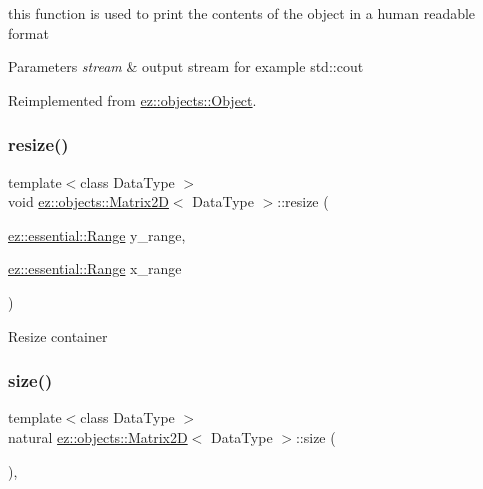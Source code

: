 this function is used to print the contents of the object in a human readable format 
\begin{DoxyParams}{Parameters}
{\em stream} & output stream for example std\+::cout \\
\hline
\end{DoxyParams}


Reimplemented from \hyperlink{classez_1_1objects_1_1Object_a9e20f39a78163f67f000576149d858b3}{ez\+::objects\+::\+Object}.

\mbox{\label{classez_1_1objects_1_1Matrix2D_a14783b5e865959b2aa6d1b19ec705b37}} 
\subsubsection{\texorpdfstring{resize()}{resize()}}
{\footnotesize\ttfamily template$<$class Data\+Type $>$ \\
void \hyperlink{classez_1_1objects_1_1Matrix2D}{ez\+::objects\+::\+Matrix2D}$<$ Data\+Type $>$\+::resize (\begin{DoxyParamCaption}\item[{\hyperlink{classez_1_1essential_1_1Range}{ez\+::essential\+::\+Range}}]{y\+\_\+range,  }\item[{\hyperlink{classez_1_1essential_1_1Range}{ez\+::essential\+::\+Range}}]{x\+\_\+range }\end{DoxyParamCaption})\hspace{0.3cm}{\ttfamily [inline]}}

Resize container \mbox{\label{classez_1_1objects_1_1Matrix2D_a236462257912521cf98d8b5899f228f2}} 
\subsubsection{\texorpdfstring{size()}{size()}}
{\footnotesize\ttfamily template$<$class Data\+Type $>$ \\
natural \hyperlink{classez_1_1objects_1_1Matrix2D}{ez\+::objects\+::\+Matrix2D}$<$ Data\+Type $>$\+::size (\begin{DoxyParamCaption}{ }\end{DoxyParamCaption})\hspace{0.3cm}{\ttfamily [inline]}, {\ttfamily [virtual]}}

